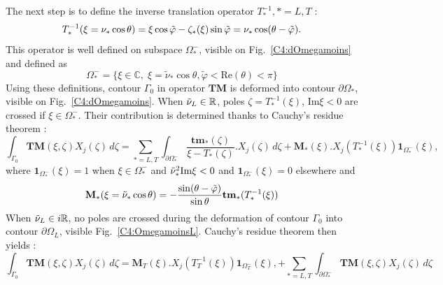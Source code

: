 The next step is to define the inverse translation operator $T_*^{-1}, *=L,T$ :
\begin{equation}
T_*^{-1}(\xi=\nu_*\cos\theta)=\xi \cos \tilde{\varphi}-\zeta_*(\xi)\sin\tilde{\varphi}=\nu_*\cos(\theta-\tilde{\varphi}).
\end{equation}
This operator is well defined on subspace $\Omega_*^-$, visible on Fig.~\ref{C4:dOmegamoins} and defined as 
\begin{equation}
\Omega_*^-=\{ \xi \in \mathbb{C}, \; \xi=\tilde{\nu}_* \cos \theta,  \tilde{\varphi}<\mbox{Re}(\theta)<\pi \}
\end{equation}
Using these definitions, contour $\Gamma_0$ in operator $\mathbf{TM}$ is deformed into contour $\partial \Omega_*$, visible on Fig.~\ref{C4:dOmegamoins}. When $\tilde{\nu}_L \in \mathbb{R}$, poles $\zeta=T_*^{-1}(\xi)$, Im$\xi<0$ are crossed if $\xi \in \Omega_*^-$. Their contribution is determined thanks to Cauchy's residue theorem :
\begin{equation}
\int_{\Gamma_0} \textbf{TM}(\xi,\zeta)X_j(\zeta)\, d\zeta = \sum_{*=L,T}\int_{\partial \Omega_*^-}  \dfrac{\textbf{tm}_*(\zeta)}{\xi-T_*(\zeta)}.X_j(\zeta)\, d\zeta+ \mathbf{M}_*(\xi).X_j(T^{-1}_*(\xi))\textbf{1}_{\Omega_*^-}(\xi),
\label{C4:TM2}
\end{equation}
where $\textbf{1}_{\Omega_*^-}(\xi)=1$ when $\xi \in \Omega_*^-$ and $\tilde{\nu}_*^2 \rm Im \xi<0$ and $\textbf{1}_{\Omega_*^-}(\xi)=0$ elsewhere and
\begin{equation}
\mathbf{M}_*(\xi=\tilde{\nu}_*\cos\theta)=-\frac{\sin(\theta-\tilde{\varphi})}{\sin\theta} \textbf{tm}_*(T_*^{-1}(\xi))
\end{equation}
When $\tilde{\nu}_L \in i\mathbb{R}$, no poles are crossed during the deformation of contour $\Gamma_0$ into contour $\partial \Omega_L$, visible Fig.~\ref{C4:OmegamoinsL}. Cauchy's residue theorem then yields :
\begin{equation}
\int_{\Gamma_0} \textbf{TM}(\xi,\zeta)X_j(\zeta)\, d\zeta =\mathbf{M}_T(\xi).X_j(T^{-1}_T(\xi))\textbf{1}_{\Omega_T^-}(\xi),+ \sum_{*=L,T}\int_{\partial \Omega_*^-}  \textbf{TM}(\xi,\zeta)X_j(\zeta)\, d\zeta
\label{C4:TM2cr}
\end{equation}

